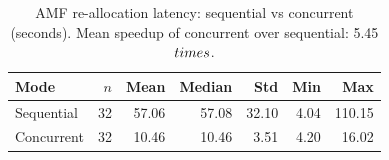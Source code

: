 \begin{table}[htbp]
\centering
\caption{AMF re-allocation latency: sequential vs concurrent (seconds). Mean speedup of concurrent over sequential: 5.45$\\times$.}
\label{tab:comparison}
\begin{tabular}{lrrrrrr}
\hline
Mode & $n$ & Mean & Median & Std & Min & Max \\
\hline
Sequential & 32 & 57.06 & 57.08 & 32.10 & 4.04 & 110.15 \\
Concurrent & 32 & 10.46 & 10.46 & 3.51 & 4.20 & 16.02 \\
\hline
\end{tabular}
\end{table}
